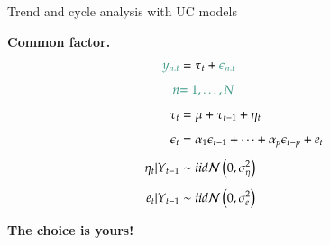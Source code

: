 \documentclass[notes,blackandwhite,mathsans]{beamer}
\begin{document}
\begin{frame}{Trend and cycle analysis with UC models}

\bigskip\textbf{Common factor.}
\begin{align*}
{\color{mcxs2}y_{n.t}} &= \tau_t + {\color{mcxs2}\epsilon_{n.t}}\\[1ex]
{\color{mcxs2}n}&{\color{mcxs2}= 1,\dots,N}\\[1ex]
\tau_t &= \mu + \tau_{t-1} + \eta_t \\[1ex]
\epsilon_t &= \alpha_1 \epsilon_{t-1} + \dots +  \alpha_p \epsilon_{t-p} + e_t \\[1ex]
\eta_t|Y_{t-1} &\sim iid\mathcal{N}\left(0,\sigma_\eta^2\right)\\[1ex]
e_t |Y_{t-1} &\sim iid\mathcal{N}\left(0,\sigma_e^2\right)
\end{align*}

\end{frame}












{
\begin{frame}{}

\bigskip
\begin{center}
\LARGE\textbf{The choice is yours!}
\end{center}



\end{frame}
}
\end{document}
